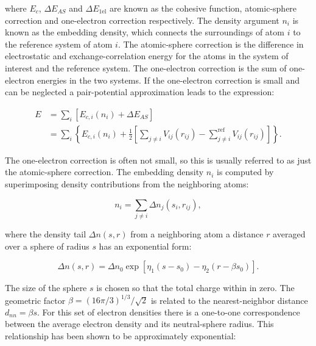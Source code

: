 where $E_c$, $\Delta E_{AS}$ and $\Delta E_{\text{1el}}$ are known as
the cohesive function, atomic-sphere correction and one-electron correction
respectively. The density argument $n_i$ is known as the embedding density,
which connects the surroundings of atom $i$ to the reference system 
of atom $i$. The atomic-sphere correction is the difference in
electrostatic and exchange-correlation energy for the atoms in the system
of interest and the reference system.
The one-electron correction is the sum of one-electron energies in the two
systems. If the one-electron correction is small and can be neglected
a pair-potential approximation leads to the expression:

\begin{equation}
    \begin{split}
    E   &=\sum_i \left[ E_{c,i}(n_i) + \Delta E_{AS} \right] \\
        &= \sum_i \left\{E_{c,i}(n_i) + \frac{1}{2} \left[
        \sum_{j \neq i} V_{ij}(r_{ij}) - \sum_{j \neq i}^{\text{ref}}
        V_{ij}(r_{ij}) \right] \right\} .
    \end{split}
\end{equation}

The one-electron correction is often not small, so this is usually
referred to as just the atomic-sphere correction.
The embedding density $n_i$ is computed by superimposing
density contributions from the neighboring atoms:

\begin{equation}
    n_i = \sum_{j \neq i} \Delta n_j(s_i, r_{ij}) ,
\end{equation}

where the density tail $\Delta n (s, r)$ from a neighboring
atom a distance $r$ averaged over a sphere of radius $s$
has an exponential form:

\begin{equation}
    \Delta n(s,r) = \Delta n_0 \exp \left[ \eta_1 (s - s_0)
    - \eta_2 (r - \beta s_0) \right] .
\end{equation}

The size of the sphere $s$ is chosen so that the total charge
within in zero. 
The geometric factor $\beta = \left(16\pi / 3\right)^{1/3} / \sqrt{2}$
is related to the nearest-neighbor distance $d_{nn} = \beta s$.
For this set of electron densities
there is a one-to-one correspondence between the average electron
density and its neutral-sphere radius.
This relationship has been shown to be approximately exponential:

